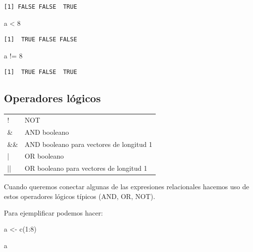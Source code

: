 \documentclass[
  spanish,
  letterpaper,
  DIV=11,
  numbers=noendperiod]{scrreprt}
\newenvironment{Shaded}{\begin{snugshade}}{\end{snugshade}}
\newcommand{\DecValTok}[1]{\textcolor[rgb]{0.68,0.00,0.00}{#1}}
\newcommand{\FunctionTok}[1]{\textcolor[rgb]{0.28,0.35,0.67}{#1}}
\newcommand{\NormalTok}[1]{\textcolor[rgb]{0.00,0.23,0.31}{#1}}
\newcommand{\OtherTok}[1]{\textcolor[rgb]{0.00,0.23,0.31}{#1}}
\newcommand{\SpecialCharTok}[1]{\textcolor[rgb]{0.37,0.37,0.37}{#1}}
\begin{document}
\begin{verbatim}
[1] FALSE FALSE  TRUE
\end{verbatim}

\begin{Shaded}
\begin{Highlighting}[]
\NormalTok{a }\SpecialCharTok{\textless{}} \DecValTok{8}
\end{Highlighting}
\end{Shaded}

\begin{verbatim}
[1]  TRUE FALSE FALSE
\end{verbatim}

\begin{Shaded}
\begin{Highlighting}[]
\NormalTok{a }\SpecialCharTok{!=} \DecValTok{8}
\end{Highlighting}
\end{Shaded}

\begin{verbatim}
[1]  TRUE FALSE  TRUE
\end{verbatim}

\subsection{Operadores lógicos}\label{operadores-luxf3gicos}

\begin{table}
\centering
\begin{tabular}[t]{l|l}
\hline
\cellcolor[HTML]{2f2e4e}{\textcolor{white}{Operador}} & \cellcolor[HTML]{2f2e4e}{\textcolor{white}{Descripción}}\\
\hline
! & NOT\\
\hline
\& & AND booleano\\
\hline
\&\& & AND booleano para vectores de longitud 1\\
\hline
| & OR booleano\\
\hline
|| & OR booleano para vectores de longitud 1\\
\hline
\end{tabular}
\end{table}

Cuando queremos conectar algunas de las expresiones relacionales hacemos
uso de estos operadores lógicos típicos (AND, OR, NOT).

Para ejemplificar podemos hacer:

\begin{Shaded}
\begin{Highlighting}[]
\NormalTok{a }\OtherTok{\textless{}{-}} \FunctionTok{c}\NormalTok{(}\DecValTok{1}\SpecialCharTok{:}\DecValTok{8}\NormalTok{)}

\NormalTok{a}
\end{Highlighting}
\end{Shaded}
\end{document}
